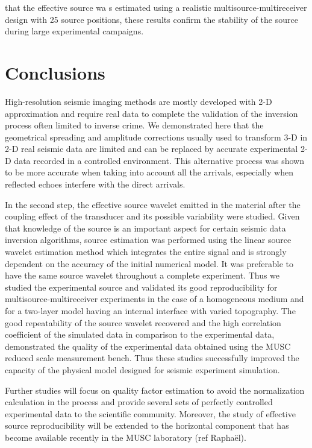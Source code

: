 \documentclass[manuscript,revised]{geophysics}
\newcommand{\twod}{2-D }
\newcommand{\thrd}{3-D }
\begin{document}
that the effective source wa	s estimated using a realistic multisource-multireceiver design with 25 source positions, these results confirm the stability of the source during large experimental campaigns. 



\section{Conclusions}

\noindent High-resolution seismic imaging methods are mostly developed with \twod approximation and require real data to complete the validation of the inversion process often limited to inverse crime. We demonstrated here that the geometrical spreading and amplitude corrections usually used to transform \thrd in \twod real seismic data are limited and can be replaced by accurate experimental \twod data recorded in a controlled environment. This alternative process was shown to be more accurate when taking into account all the arrivals, especially when reflected echoes interfere with the direct arrivals.

\noindent In the second step, the effective source wavelet emitted in the material after the coupling effect of the transducer and its possible variability were studied. Given that knowledge of the source is an important aspect for certain seismic data inversion algorithms, source estimation was performed using the linear source wavelet estimation method which integrates the entire signal and is strongly dependent on the accuracy of the initial numerical model. It was preferable to have the same source wavelet throughout a complete experiment. Thus we studied the experimental source and validated its good reproducibility for multisource-multireceiver experiments in the case of a homogeneous medium and for a two-layer model having an internal interface with varied topography. The good repeatability of the source wavelet recovered and the high correlation coefficient of the simulated data in comparison to the experimental data, demonstrated the quality of the experimental data obtained using the MUSC reduced scale measurement bench. 
\noindent Thus these studies successfully improved the capacity of the physical model designed for seismic experiment simulation. 

\noindent Further studies will focus on quality factor estimation to avoid the normalization calculation in the process and provide several sets of perfectly controlled experimental data to the scientific community. Moreover, the study of effective source reproducibility will be extended to the horizontal component that has become available recently in the MUSC laboratory (ref Raphaël).
\end{document}
